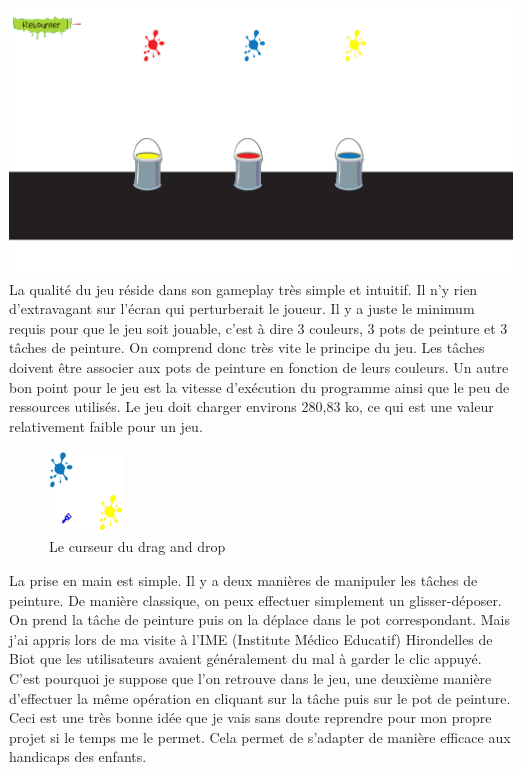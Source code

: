 \documentclass{article}
\begin{document}
\vspace{0.5cm}
\includegraphics[width=\textwidth]{4}\\
\hspace*{0.6cm}La qualité du jeu réside dans son gameplay très simple et intuitif. Il n'y rien d'extravagant sur l'écran qui perturberait le joueur. Il y a juste le minimum requis pour que le jeu soit jouable, c'est à dire 3 couleurs, 3 pots de peinture et 3 tâches de peinture. On comprend donc très vite le principe du jeu. Les t\^aches doivent être associer aux pots de peinture en fonction de leurs couleurs. Un autre bon point pour le jeu est la vitesse d'exécution du programme ainsi que le peu de ressources utilisés. Le jeu doit charger environs 280,83 ko, ce qui est une valeur relativement faible pour un jeu.\\

\begin{figure}
  \vspace{-20pt}
  \begin{center}
    \includegraphics[width=0.18\textwidth]{10}
  \end{center}
  \vspace{-20pt}
  \caption{Le curseur du drag and drop}
  \vspace{-10pt}
\end{figure}

La prise en main est simple. Il y a deux manières de manipuler les tâches de peinture. De manière classique, on peux effectuer simplement un glisser-déposer. On prend la t\^ache de peinture puis on la déplace dans le pot correspondant. Mais j'ai appris lors de ma visite à l'IME (Institute Médico Educatif) Hirondelles de Biot que les utilisateurs avaient généralement du mal à garder le clic appuyé. C'est pourquoi je suppose que l'on retrouve dans le jeu, une deuxième manière d'effectuer la même opération en cliquant sur la t\^ache puis sur le pot de peinture. Ceci est une très bonne idée que je vais sans doute reprendre pour mon propre projet si le temps me le permet. Cela permet de s'adapter de manière efficace aux handicaps des enfants.\\
\end{document}
